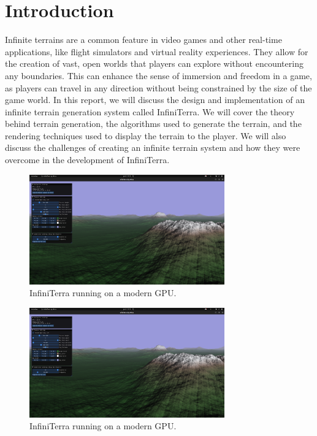 \documentclass{article}
\begin{document}
\section{Introduction}
\label{ch:introduction}
Infinite terrains are a common feature in video games and other real-time applications, like flight
simulators and virtual reality experiences. They allow for the creation of vast, open worlds that
players can explore without encountering any boundaries. This can enhance the sense of immersion
and freedom in a game, as players can travel in any direction without being constrained by the size
of the game world. In this report, we will discuss the design and implementation of an infinite
terrain generation system called InfiniTerra. We will cover the theory behind terrain generation,
the algorithms used to generate the terrain, and the rendering techniques used to display the
terrain to the player. We will also discuss the challenges of creating an infinite terrain system
and how they were overcome in the development of InfiniTerra.

\begin{figure}[H]
	\centering
	\includegraphics[width=0.75\textwidth]{img/infiniterra.png}
	\caption{InfiniTerra running on a modern GPU.}
	\label{fig:infiniterra}
\end{figure}


\begin{figure}[H]
	\centering
	\includegraphics[width=0.75\textwidth]{img/infiniterra.png}
	\caption{InfiniTerra running on a modern GPU.}
	\label{fig:infiniterra}
\end{figure}
\end{document}
